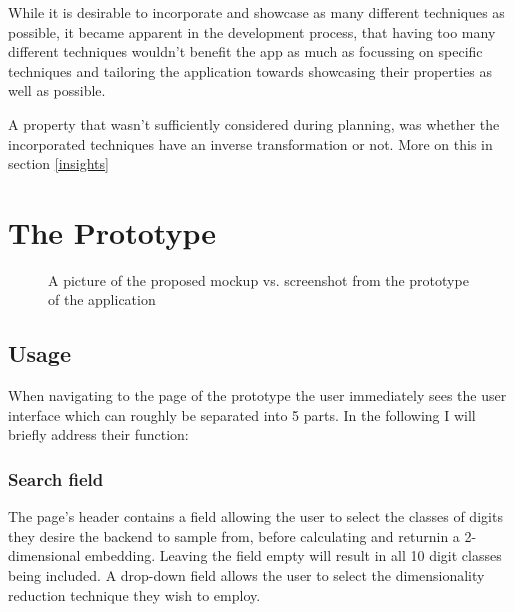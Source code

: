 \documentclass[11pt,a4paper]{article}
\begin{document}
    While it is desirable to incorporate and showcase as many different techniques as possible, it became apparent in the development process, that having too many different techniques wouldn't benefit the app as much as focussing on specific techniques and tailoring the application towards showcasing their properties as well as possible.

    A property that wasn't sufficiently considered during planning, was whether the incorporated techniques have an inverse transformation or not. More on this in section \ref{insights}
  
  \section{The Prototype}
    \begin{figure}
    \vspace{3px}
      \caption{A picture of the proposed mockup vs.  screenshot from the prototype of the application}
    \end{figure}

    \subsection{Usage}
      When navigating to the page of the prototype the user immediately sees the user interface which can roughly be separated into 5 parts. In the following I will briefly address their function:
      \subsubsection*{Search field}
        The page's header contains a field allowing the user to select the classes of digits they desire the backend to sample from, before calculating and returnin a 2-dimensional embedding. Leaving the field empty will result in all 10 digit classes being included. A drop-down field allows the user to select the dimensionality reduction technique they wish to employ. 
\end{document}

